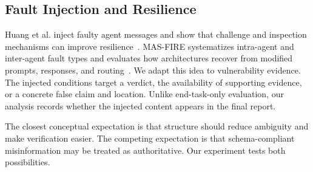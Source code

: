 \subsection{Fault Injection and Resilience}

Huang et al. inject faulty agent messages and show that challenge and inspection mechanisms can improve resilience~\cite{huang2025resilience}. MAS-FIRE systematizes intra-agent and inter-agent fault types and evaluates how architectures recover from modified prompts, responses, and routing~\cite{jia2026masfire}. We adapt this idea to vulnerability evidence. The injected conditions target a verdict, the availability of supporting evidence, or a concrete false claim and location. Unlike end-task-only evaluation, our analysis records whether the injected content appears in the final report.

The closest conceptual expectation is that structure should reduce ambiguity and make verification easier. The competing expectation is that schema-compliant misinformation may be treated as authoritative. Our experiment tests both possibilities.
